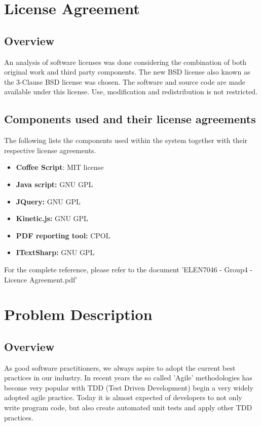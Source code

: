 \documentclass[a4paper,12pt]{article}
\begin{document}
\section{License Agreement}
\subsection{Overview}
An analysis of software licenses was done considering the combination of both original work and third party components. The new BSD license also known as the 3-Clause BSD\cite{bds} license was chosen. The software and source code are made available under this license. Use, modification and redistribution is not restricted. 
\subsection{Components used and their license agreements}
The following lists the components used within the system together with their respective license agreements.
\begin{itemize}
\item \textbf{Coffee Script}: MIT license\cite{mit}
\item \textbf{Java script:} GNU GPL\cite{gnugpl}
\item \textbf{JQuery:} GNU GPL\cite{gnugpl}
\item \textbf{Kinetic.js:} GNU GPL\cite{gnugpl}
\item \textbf{PDF reporting tool:} CPOL\cite{cpol}
\item \textbf{ITextSharp:} GNU GPL\cite{gnugpl}
\end{itemize}

For the complete reference, please refer to the document 'ELEN7046 - Group4 - Licence Agreement.pdf'\cite{licenceDoc}

\section{Problem Description}
\subsection{Overview}
As good software practitioners, we always aspire to adopt the current best practices in our industry. In recent years the so called 'Agile' methodologies has become very popular with TDD\cite{tdd} (Test Driven Development) begin a very widely adopted agile practice. Today it is almost expected of developers to not only write program code, but also create automated unit tests and apply other TDD practices.
\end{document}
